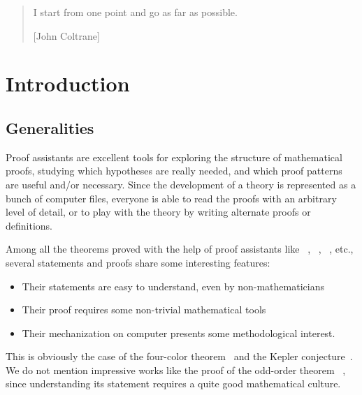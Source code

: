 \documentclass[twoside,a4paper]{book}
\begin{document}
\vspace{2cm}
\begin{quote} 
I start from one point and go as far as possible. 

[John Coltrane]
\end{quote}

  





 \tableofcontents



\chapter{Introduction}

  

\vspace{16pt}

\section{Generalities}

Proof assistants are excellent tools for exploring the structure of mathematical proofs,
studying  which hypotheses are really needed, and which proof patterns are useful and/or
necessary. Since the development of a theory is represented as a bunch of computer files,
everyone is able to read the proofs with an arbitrary level of detail, or to play with the theory by writing alternate proofs or definitions.


Among all the theorems proved with the help of proof assistants like \coq{}~\cite{Coq,BC04}, \hol{}~\cite{HOL}, \isabelle{}~\cite{isabelle},  etc.,
several statements and proofs  share some interesting features:
\begin{itemize}
\item Their statements are easy to understand, even by non-mathematicians
\item Their proof requires some non-trivial mathematical tools
\item Their mechanization on computer presents some methodological interest.
\end{itemize}






This is obviously the case of the four-color theorem~\cite{fourcolors}  and the Kepler conjecture~\cite{flyspeck2015}. We do not mention impressive works like the proof of the odd-order theorem ~\cite{oddorderthm}, since understanding its statement requires a quite good mathematical culture.
\end{document}
